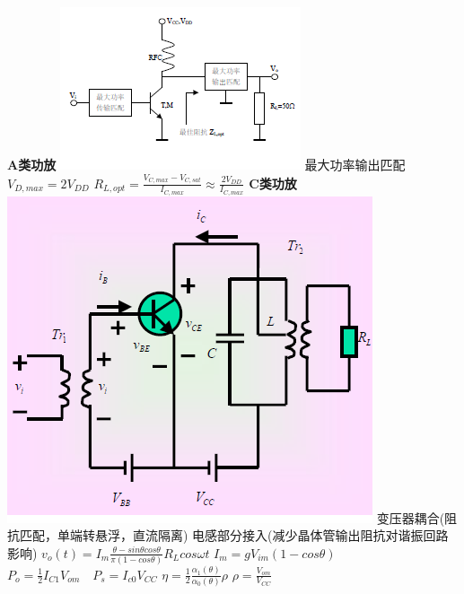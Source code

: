 \documentclass[10.5pt,landscape]{article}
\begin{document}
\begin{multicols*}{4}
\textbf{A类功放} \newline
\includegraphics[scale=0.8]{A_PA}\newline
最大功率输出匹配 \newline
$V_{D, max} = 2V_{DD}$ \newline
$R_{L, opt} = \frac{V_{C, max} - V_{C, sat}}{I_{C, max}} \approx \frac{2V_{DD}}{I_{C,  max}}$\newline
\textbf{C类功放} \newline
\includegraphics[scale=0.5]{C_PA}\newline
变压器耦合(阻抗匹配，单端转悬浮，直流隔离) \newline
电感部分接入(减少晶体管输出阻抗对谐振回路影响)\newline
$ v_o(t) = I_m \frac{\theta - sin\theta cos\theta}{\pi(1 - cos\theta)}R_L cos\omega t $\newline
$ I_m = g V_{im}(1 - cos\theta)$ \newline
$P_o = \frac{1}{2} I_{C1}V_{om} \quad P_s = I_{c0}V_{CC}$\newline
$\eta = \frac{1}{2}\frac{\alpha_1(\theta)}{\alpha_0(\theta)}\rho$ \newline
$\rho = \frac{V_{om}}{V_{CC}} $\newline

\end{multicols*}
\end{document}
